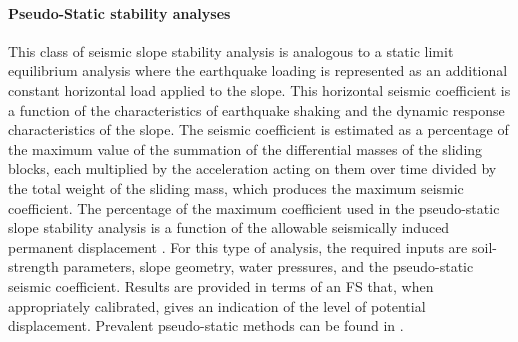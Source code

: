 \paragraph{Pseudo-Static stability analyses} 
This class of seismic slope stability analysis is analogous to a static limit equilibrium analysis where the earthquake loading is represented as an additional constant horizontal load applied to the slope. This horizontal seismic coefficient is a function of the characteristics of earthquake shaking and the dynamic response characteristics of the slope. The seismic coefficient is estimated as a percentage of the maximum value of the summation of the differential masses of the sliding blocks, each multiplied by the acceleration acting on them over time divided by the total weight of the sliding mass, which produces the maximum seismic coefficient. The percentage of the maximum coefficient used in the pseudo-static slope stability analysis is a function of the allowable seismically induced permanent displacement \citep{bray2009pseudostatic}. For this type of analysis, the required inputs are soil-strength parameters, slope geometry, water pressures, and the pseudo-static seismic coefficient. Results are provided in terms of an FS that, when appropriately calibrated, gives an indication of the level of potential displacement. Prevalent pseudo-static methods can be found in  \citet{seed1979considerations, hynes-griffin1984rationalizing, bray2009pseudostatic, macedo2018performancebased, bray2019procedure}.


